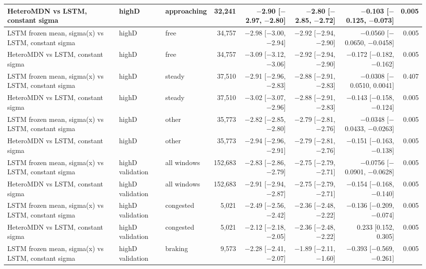 \begin{longtable}{lllrrrrr}
\midrule
HeteroMDN vs LSTM, constant sigma & highD & approaching & 32,241 & $-$2.90 [$-$2.97, $-$2.80] & $-$2.80 [$-$2.85, $-$2.72] & $-$0.103 [$-$0.125, $-$0.073] & 0.005 \\
\midrule
LSTM frozen mean, sigma(x) vs LSTM, constant sigma & highD & free & 34,757 & $-$2.98 [$-$3.00, $-$2.94] & $-$2.92 [$-$2.94, $-$2.90] & $-$0.0560 [$-$0.0650, $-$0.0458] & 0.005 \\
\midrule
HeteroMDN vs LSTM, constant sigma & highD & free & 34,757 & $-$3.09 [$-$3.12, $-$3.06] & $-$2.92 [$-$2.94, $-$2.90] & $-$0.172 [$-$0.182, $-$0.162] & 0.005 \\
\midrule
LSTM frozen mean, sigma(x) vs LSTM, constant sigma & highD & steady & 37,510 & $-$2.91 [$-$2.96, $-$2.83] & $-$2.88 [$-$2.91, $-$2.83] & $-$0.0308 [$-$0.0510, 0.0041] & 0.407 \\
\midrule
HeteroMDN vs LSTM, constant sigma & highD & steady & 37,510 & $-$3.02 [$-$3.07, $-$2.96] & $-$2.88 [$-$2.91, $-$2.83] & $-$0.143 [$-$0.158, $-$0.124] & 0.005 \\
\midrule
LSTM frozen mean, sigma(x) vs LSTM, constant sigma & highD & other & 35,773 & $-$2.82 [$-$2.85, $-$2.80] & $-$2.79 [$-$2.81, $-$2.76] & $-$0.0348 [$-$0.0433, $-$0.0263] & 0.005 \\
\midrule
HeteroMDN vs LSTM, constant sigma & highD & other & 35,773 & $-$2.94 [$-$2.96, $-$2.91] & $-$2.79 [$-$2.81, $-$2.76] & $-$0.151 [$-$0.163, $-$0.138] & 0.005 \\
\midrule
LSTM frozen mean, sigma(x) vs LSTM, constant sigma & highD validation & all windows & 152,683 & $-$2.83 [$-$2.86, $-$2.79] & $-$2.75 [$-$2.79, $-$2.71] & $-$0.0756 [$-$0.0901, $-$0.0628] & 0.005 \\
\midrule
HeteroMDN vs LSTM, constant sigma & highD validation & all windows & 152,683 & $-$2.91 [$-$2.94, $-$2.87] & $-$2.75 [$-$2.79, $-$2.71] & $-$0.154 [$-$0.168, $-$0.140] & 0.005 \\
\midrule
LSTM frozen mean, sigma(x) vs LSTM, constant sigma & highD validation & congested & 5,021 & $-$2.49 [$-$2.56, $-$2.42] & $-$2.36 [$-$2.48, $-$2.22] & $-$0.136 [$-$0.209, $-$0.074] & 0.005 \\
\midrule
HeteroMDN vs LSTM, constant sigma & highD validation & congested & 5,021 & $-$2.12 [$-$2.18, $-$2.05] & $-$2.36 [$-$2.48, $-$2.22] & 0.233 [0.152, 0.305] & 0.005 \\
\midrule
LSTM frozen mean, sigma(x) vs LSTM, constant sigma & highD validation & braking & 9,573 & $-$2.28 [$-$2.41, $-$2.07] & $-$1.89 [$-$2.11, $-$1.60] & $-$0.393 [$-$0.569, $-$0.261] & 0.005 \\

\end{longtable}
